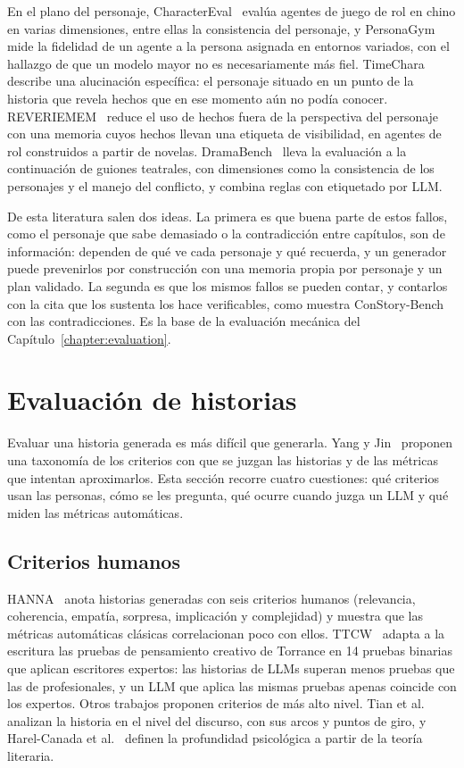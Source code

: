 En el plano del personaje, CharacterEval~\cite{tu2024} evalúa agentes de juego de rol en chino en
varias dimensiones, entre ellas la consistencia del personaje, y PersonaGym~\cite{samuel2025} mide la
fidelidad de un agente a la persona asignada en entornos variados, con el hallazgo de que un modelo
mayor no es necesariamente más fiel. TimeChara~\cite{ahn2024} describe una alucinación específica: el
personaje situado en un punto de la historia que revela hechos que en ese momento aún no podía
conocer. REVERIEMEM~\cite{tang2026} reduce el uso de hechos fuera de la perspectiva del personaje
con una memoria cuyos hechos llevan una etiqueta de visibilidad, en agentes de rol construidos a
partir de novelas. DramaBench~\cite{ma2025} lleva la evaluación a la continuación de guiones teatrales, con
dimensiones como la consistencia de los personajes y el manejo del conflicto, y combina reglas con
etiquetado por LLM.

De esta literatura salen dos ideas. La primera es que buena parte de estos fallos, como el personaje
que sabe demasiado o la contradicción entre capítulos, son de información: dependen de qué ve cada
personaje y qué recuerda, y un generador puede prevenirlos por construcción con una memoria propia
por personaje y un plan validado. La segunda es que los mismos fallos se pueden contar, y contarlos
con la cita que los sustenta los hace verificables, como muestra ConStory-Bench con las
contradicciones. Es la base de la evaluación mecánica del Capítulo~\ref{chapter:evaluation}.

\section{Evaluación de historias}\label{sec:evaluacion-historias}

Evaluar una historia generada es más difícil que generarla. Yang y Jin~\cite{yang2024} proponen una
taxonomía de los criterios con que se juzgan las historias y de las métricas que intentan
aproximarlos. Esta sección recorre cuatro cuestiones: qué criterios usan las personas, cómo se les
pregunta, qué ocurre cuando juzga un LLM y qué miden las métricas automáticas.

\subsection{Criterios humanos}\label{sec:criterios-humanos}

HANNA~\cite{chhun2022} anota historias generadas con seis criterios humanos (relevancia, coherencia,
empatía, sorpresa, implicación y complejidad) y muestra que las métricas automáticas clásicas
correlacionan poco con ellos. TTCW~\cite{chakrabarty2024} adapta a la escritura las pruebas de
pensamiento creativo de Torrance en 14 pruebas binarias que aplican escritores expertos: las
historias de LLMs superan menos pruebas que las de profesionales, y un LLM que aplica las mismas
pruebas apenas coincide con los expertos. Otros trabajos proponen criterios de más alto nivel. Tian
et al.~\cite{tian2024} analizan la historia en el nivel del discurso, con sus arcos y puntos de giro,
y Harel-Canada et al.~\cite{harelcanada2024} definen la profundidad psicológica a partir de la
teoría literaria.

